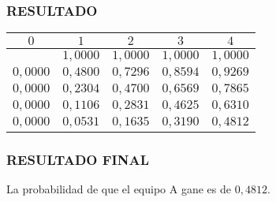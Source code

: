 \documentclass[10]{beamer}
\begin{document}
\begin{frame}
\color{white}
\frametitle{RESULTADO}
\begin{table}
 \begin{tabular}{ c | c  | c  | c  | c }
 \\  $0$ & $1$   & $2$   & $3$   & $4$  \\ 
 \hline \hline 
   & $1,0000$   & $1,0000$   & $1,0000$   & $1,0000$   \\ 
 $0,0000$ & $0,4800$   & $0,7296$   & $0,8594$   & $0,9269$   \\ 
 $0,0000$ & $0,2304$   & $0,4700$   & $0,6569$   & $0,7865$   \\ 
 $0,0000$ & $0,1106$   & $0,2831$   & $0,4625$   & $0,6310$   \\ 
 $0,0000$ & $0,0531$   & $0,1635$   & $0,3190$   & $0,4812$   \\ 
 \end{tabular}
 \end{table}
 \end{frame} 
\begin{frame}
\color{white}
\frametitle{RESULTADO FINAL}
La probabilidad de que el equipo A gane es de $0,4812$. \\\end{frame} 
\end{document}

